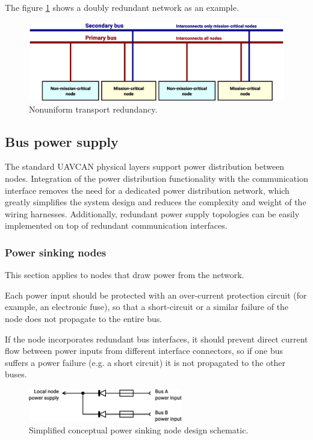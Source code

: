 The figure \ref{fig:physical_nonuniform_transport_redundancy} shows a doubly redundant network as an example.

\begin{figure}[H]
    \centering
	\includegraphics[width=\textwidth]{physical/nonuniform_bus_redundancy}
	\caption{Nonuniform transport redundancy.\label{fig:physical_nonuniform_transport_redundancy}}
\end{figure}

\subsection{Bus power supply}

The standard UAVCAN physical layers support power distribution between nodes.
Integration of the power distribution functionality with the communication interface
removes the need for a dedicated power distribution network,
which greatly simplifies the system design and reduces the complexity and weight of the wiring harnesses.
Additionally, redundant power supply topologies can be easily implemented on top of redundant communication interfaces.

\subsubsection{Power sinking nodes}

This section applies to nodes that draw power from the network.

Each power input should be protected with an over-current protection circuit (for example, an electronic fuse),
so that a short-circuit or a similar failure of the node does not propagate to the entire bus.

If the node incorporates redundant bus interfaces,
it should prevent direct current flow between power inputs from different interface connectors,
so if one bus suffers a power failure (e.g. a short circuit) it is not propagated to the other buses.

\begin{figure}[H]
    \centering
	\includegraphics[width=0.6\textwidth]{physical/redundant_bus_power_sink}
	\caption{Simplified conceptual power sinking node design schematic.\label{fig:physical_redundant_bus_power_sink}}
\end{figure}

